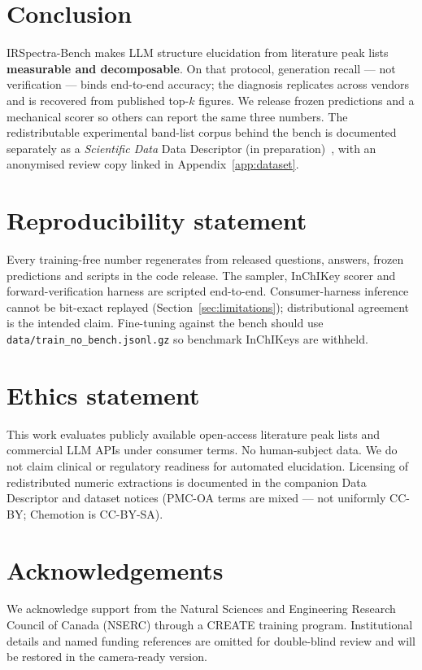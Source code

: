 \documentclass{article}
\begin{document}
\section{Conclusion}
\label{sec:conclusion}

IRSpectra-Bench makes LLM structure elucidation from literature peak lists \textbf{measurable
and decomposable}.
On that protocol, generation recall --- not verification --- binds end-to-end accuracy; the
diagnosis replicates across vendors and is recovered from published top-$k$ figures.
We release frozen predictions and a mechanical scorer so others can report the same three
numbers.
The redistributable experimental band-list corpus behind the bench is documented separately
as a \textit{Scientific Data} Data Descriptor (in preparation)~\citep{yabbarov2026irexp}, with an
anonymised review copy linked in Appendix~\ref{app:dataset}.

\section*{Reproducibility statement}
Every training-free number regenerates from released questions, answers, frozen predictions
and scripts in the code release.
The sampler, InChIKey scorer and forward-verification harness are scripted end-to-end.
Consumer-harness inference cannot be bit-exact replayed (Section~\ref{sec:limitations});
distributional agreement is the intended claim.
Fine-tuning against the bench should use \texttt{data/train\_no\_bench.jsonl.gz} so benchmark
InChIKeys are withheld.

\section*{Ethics statement}
This work evaluates publicly available open-access literature peak lists and commercial LLM
APIs under consumer terms.
No human-subject data.
We do not claim clinical or regulatory readiness for automated elucidation.
Licensing of redistributed numeric extractions is documented in the companion Data Descriptor
and dataset notices (PMC-OA terms are mixed --- not uniformly CC-BY; Chemotion is CC-BY-SA).

\section*{Acknowledgements}
We acknowledge support from the Natural Sciences and Engineering Research Council of Canada (NSERC) through a CREATE training program. Institutional details and named funding references are omitted for double-blind review and will be restored in the camera-ready version.


\end{document}
